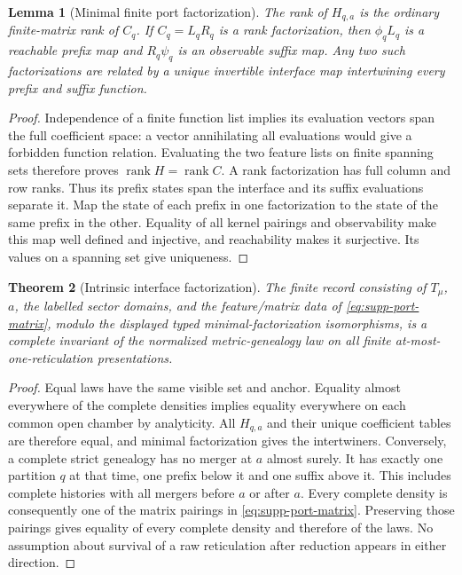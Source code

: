 \documentclass[11pt]{article}
\newtheorem{theorem}{Theorem}[section]
\newtheorem{lemma}[theorem]{Lemma}
\begin{document}
\begin{lemma}[Minimal finite port factorization]
The rank of $H_{q,a}$ is the ordinary finite-matrix rank of $C_q$.  If $C_q=L_qR_q$ is a rank factorization, then $\phi_qL_q$ is a reachable prefix map and $R_q\psi_q$ is an observable suffix map.  Any two such factorizations are related by a unique invertible interface map intertwining every prefix and suffix function.
\end{lemma}

\begin{proof}
Independence of a finite function list implies its evaluation vectors span the full coefficient space: a vector annihilating all evaluations would give a forbidden function relation.  Evaluating the two feature lists on finite spanning sets therefore proves $\operatorname{rank}H=\operatorname{rank}C$.  A rank factorization has full column and row ranks.  Thus its prefix states span the interface and its suffix evaluations separate it.  Map the state of each prefix in one factorization to the state of the same prefix in the other.  Equality of all kernel pairings and observability make this map well defined and injective, and reachability makes it surjective.  Its values on a spanning set give uniqueness.
\end{proof}

\begin{theorem}[Intrinsic interface factorization]
The finite record consisting of $T_\mu$, $a$, the labelled sector domains, and the feature/matrix data of \eqref{eq:supp-port-matrix}, modulo the displayed typed minimal-factorization isomorphisms, is a complete invariant of the normalized metric-genealogy law on all finite at-most-one-reticulation presentations.
\end{theorem}

\begin{proof}
Equal laws have the same visible set and anchor.  Equality almost everywhere of the complete densities implies equality everywhere on each common open chamber by analyticity.  All $H_{q,a}$ and their unique coefficient tables are therefore equal, and minimal factorization gives the intertwiners.  Conversely, a complete strict genealogy has no merger at $a$ almost surely.  It has exactly one partition $q$ at that time, one prefix below it and one suffix above it.  This includes complete histories with all mergers before $a$ or after $a$.  Every complete density is consequently one of the matrix pairings in \eqref{eq:supp-port-matrix}.  Preserving those pairings gives equality of every complete density and therefore of the laws.  No assumption about survival of a raw reticulation after reduction appears in either direction.
\end{proof}
\end{document}
